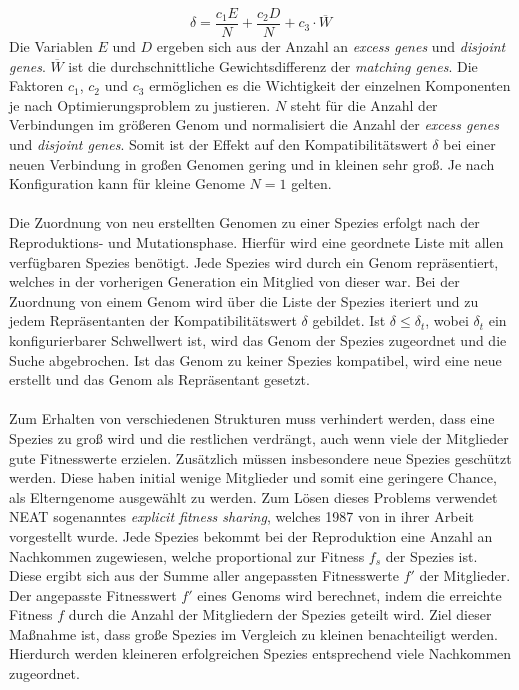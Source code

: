 $$\delta=\frac{c_1E}{N}+\frac{c_2D}{N}+c_3 \cdot \overline{W}$$
Die Variablen $E$ und $D$ ergeben sich aus der Anzahl an \emph{excess genes} und \emph{disjoint genes}. $\overline{W}$ ist die durchschnittliche Gewichtsdifferenz der \emph{matching genes}. Die Faktoren $c_1$, $c_2$ und $c_3$ ermöglichen es die Wichtigkeit der einzelnen Komponenten je nach Optimierungsproblem zu justieren. $N$ steht für die Anzahl der Verbindungen im größeren Genom und normalisiert die Anzahl der \emph{excess genes} und \emph{disjoint genes}. Somit ist der Effekt auf den Kompatibilitätswert $\delta$ bei einer neuen Verbindung in großen Genomen gering und in kleinen sehr groß. Je nach Konfiguration kann für kleine Genome $N=1$ gelten.
\\\\
Die Zuordnung von neu erstellten Genomen zu einer Spezies erfolgt nach der Reproduktions- und Mutationsphase. Hierfür wird eine geordnete Liste mit allen verfügbaren Spezies benötigt. Jede Spezies wird durch ein Genom repräsentiert, welches in der vorherigen Generation ein Mitglied von dieser war. Bei der Zuordnung von einem Genom wird über die Liste der Spezies iteriert und zu jedem Repräsentanten der Kompatibilitätswert $\delta$ gebildet. Ist $\delta \leq \delta_t$, wobei $\delta_t$ ein konfigurierbarer Schwellwert ist, wird das Genom der Spezies zugeordnet und die Suche abgebrochen. Ist das Genom zu keiner Spezies kompatibel, wird eine neue erstellt und das Genom als Repräsentant gesetzt.
\\\\
Zum Erhalten von verschiedenen Strukturen muss verhindert werden, dass eine Spezies zu groß wird und die restlichen verdrängt, auch wenn viele der Mitglieder gute Fitnesswerte erzielen. Zusätzlich müssen insbesondere neue Spezies geschützt werden. Diese haben initial wenige Mitglieder und somit eine geringere Chance, als Elterngenome ausgewählt zu werden. Zum Lösen dieses Problems verwendet \ac{NEAT} sogenanntes \emph{explicit fitness sharing}, welches 1987 von \citeauthor{goldberg1987genetic} in ihrer Arbeit \cite{goldberg1987genetic} vorgestellt wurde. Jede Spezies bekommt bei der Reproduktion eine Anzahl an Nachkommen zugewiesen, welche proportional zur Fitness $f_{s}$ der Spezies ist. Diese ergibt sich aus der Summe aller angepassten Fitnesswerte $f'$ der Mitglieder. Der angepasste Fitnesswert $f'$ eines Genoms wird berechnet, indem die erreichte Fitness $f$ durch die Anzahl der Mitgliedern der Spezies geteilt wird. Ziel dieser Maßnahme ist, dass große Spezies im Vergleich zu kleinen benachteiligt werden. Hierdurch werden kleineren erfolgreichen Spezies entsprechend viele Nachkommen zugeordnet.
